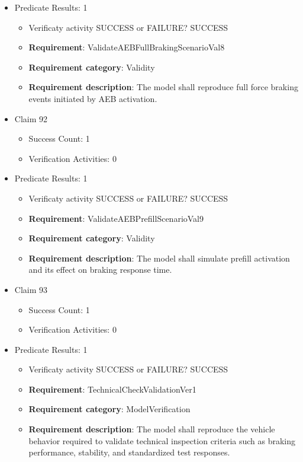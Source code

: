 \documentclass{article}
\begin{document}
\begin{itemize}
									    
				\item Predicate Results: 1
					\begin{itemize}				
					\item Verificaty activity SUCCESS or FAILURE? SUCCESS
					
					\item \textbf{Requirement}: ValidateAEBFullBrakingScenarioVal8 
					\item \textbf{Requirement category}: Validity
					\item \textbf{Requirement description}: The model shall reproduce full force braking events initiated by AEB activation.
					\end{itemize}

  				  \item Claim 92
				\begin{itemize}
			    	\item Success Count: 1 
			    	\item Verification Activities: 0
				\end{itemize}
				
									    
				\item Predicate Results: 1
					\begin{itemize}				
					\item Verificaty activity SUCCESS or FAILURE? SUCCESS
					
					\item \textbf{Requirement}: ValidateAEBPrefillScenarioVal9 
					\item \textbf{Requirement category}: Validity
					\item \textbf{Requirement description}: The model shall simulate prefill activation and its effect on braking response time.
					\end{itemize}

  				  \item Claim 93
				\begin{itemize}
			    	\item Success Count: 1 
			    	\item Verification Activities: 0
				\end{itemize}
				
									    
				\item Predicate Results: 1
					\begin{itemize}				
					\item Verificaty activity SUCCESS or FAILURE? SUCCESS
					
					\item \textbf{Requirement}: TechnicalCheckValidationVer1 
					\item \textbf{Requirement category}: ModelVerification
					\item \textbf{Requirement description}: The model shall reproduce the vehicle behavior required to validate technical inspection criteria such as braking performance, stability, and standardized test responses.
					\end{itemize}


\end{itemize}
\end{document}
